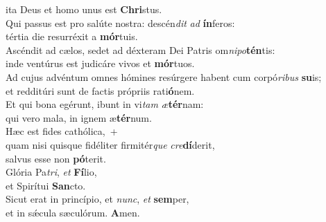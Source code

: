 \oddverse ita Deus et homo unus est \textbf{Chri}stus.\\
\evenverse Qui passus est pro salúte nostra: descén\textit{dit} \textit{ad} \textbf{ín}feros:~\*\\
\evenverse tértia die resurréxit a \textbf{mór}tuis.\\
\oddverse Ascéndit ad cælos, sedet ad déxteram Dei Patris om\textit{ni}\textit{po}\textbf{tén}tis:~\*\\
\oddverse inde ventúrus est judicáre vivos et \textbf{mór}tuos.\\
\evenverse Ad cujus advéntum omnes hómines resúrgere habent cum corpó\textit{ri}\textit{bus} \textbf{su}is;~\*\\
\evenverse et redditúri sunt de factis própriis rati\textbf{ó}nem.\\
\oddverse Et qui bona egérunt, ibunt in vi\textit{tam} \textit{æ}\textbf{tér}nam:~\*\\
\oddverse qui vero mala, in ignem æ\textbf{tér}num.\\
\evenverse Hæc est fides cathólica,~+\\
\evenverse  quam nisi quisque fidéliter firmitér\textit{que} \textit{cre}\textbf{dí}derit,~\*\\
\evenverse salvus esse non \textbf{pó}terit.\\
\oddverse Glória Pa\textit{tri}, \textit{et} \textbf{Fí}lio,~\*\\
\oddverse et Spirítui \textbf{San}cto.\\
\evenverse Sicut erat in princípio, et \textit{nunc}, \textit{et} \textbf{sem}per,~\*\\
\evenverse et in sǽcula sæculórum. \textbf{A}men.\\

